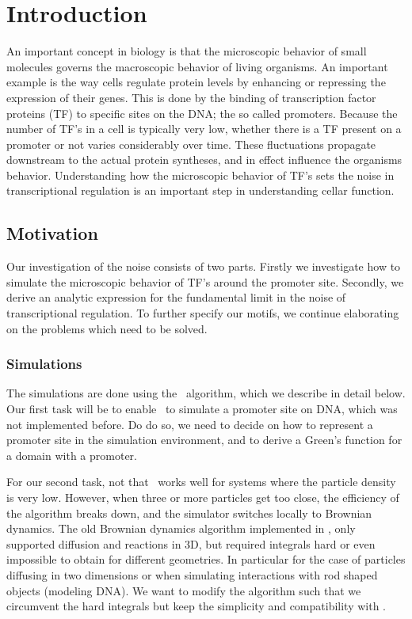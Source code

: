 \section{Introduction}

An important concept in biology is that the microscopic behavior of small molecules governs the macroscopic behavior of living organisms. An important example is the way cells regulate protein levels by enhancing or repressing the expression of their genes. This is done by the binding of transcription factor proteins (TF) to specific sites on the DNA; the so called promoters. Because the number of TF's in a cell is typically very low, whether there is a TF present on a promoter or not varies considerably over time. These fluctuations propagate downstream to the actual protein syntheses, and in effect influence the organisms behavior. Understanding how the microscopic behavior of TF's sets the noise in transcriptional regulation is an important step in understanding cellar function.

\subsection{Motivation}
Our investigation of the noise consists of two parts. Firstly we investigate how to simulate the microscopic behavior of TF's around the promoter site. Secondly, we derive an analytic expression for the fundamental limit in the noise of transcriptional regulation. To further specify our motifs, we continue elaborating on the problems which need to be solved.

\subsubsection{Simulations}
The simulations are done using the \GFRD\, algorithm, which we describe in detail below. Our first task will be to enable \GFRD\, to simulate a promoter site on DNA, which was not implemented before. Do do so, we need to decide on how to represent a promoter site in the simulation environment, and to derive a Green's function for a domain with a promoter. 

For our second task, not that \GFRD\, works well for systems where the particle density is very low. However, when three or more particles get too close, the efficiency of the algorithm breaks down, and the simulator switches locally to Brownian dynamics. The old Brownian dynamics algorithm implemented in \GFRD \cite{Morelli2008a}, only supported diffusion and reactions in 3D, but required integrals hard or even impossible to obtain for different geometries. In particular for the case of particles diffusing in two dimensions or when simulating interactions with rod shaped objects (modeling DNA). We want to modify the algorithm such that we circumvent the hard integrals but keep the simplicity and compatibility with \GFRD.

